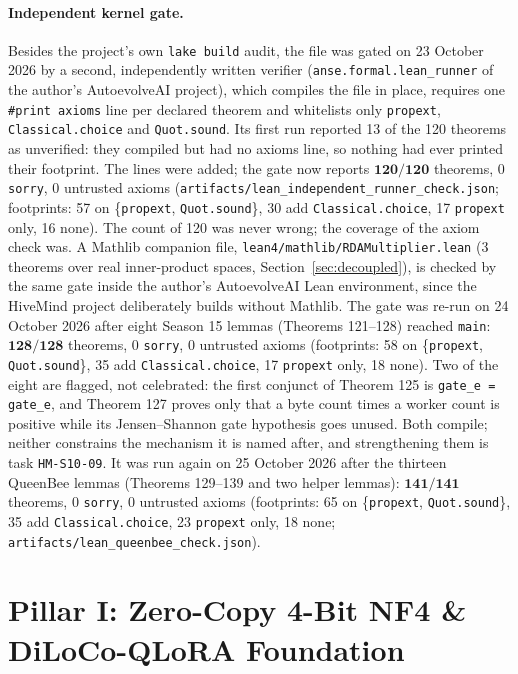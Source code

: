 \documentclass[11pt,a4paper]{article}
\begin{document}
\paragraph{Independent kernel gate.} Besides the project's own \texttt{lake build} audit, the file was gated on 23 October 2026 by a second, independently written verifier (\texttt{anse.formal.lean\_runner} of the author's AutoevolveAI project), which compiles the file in place, requires one \texttt{\#print axioms} line per declared theorem and whitelists only \texttt{propext}, \texttt{Classical.choice} and \texttt{Quot.sound}. Its first run reported 13 of the 120 theorems as unverified: they compiled but had no axioms line, so nothing had ever printed their footprint. The lines were added; the gate now reports $\mathbf{120/120}$ theorems, $0$ \texttt{sorry}, $0$ untrusted axioms (\texttt{artifacts/lean\_independent\_runner\_check.json}; footprints: 57 on \{\texttt{propext}, \texttt{Quot.sound}\}, 30 add \texttt{Classical.choice}, 17 \texttt{propext} only, 16 none). The count of 120 was never wrong; the coverage of the axiom check was. A Mathlib companion file, \texttt{lean4/mathlib/RDAMultiplier.lean} (3 theorems over real inner-product spaces, Section~\ref{sec:decoupled}), is checked by the same gate inside the author's AutoevolveAI Lean environment, since the HiveMind project deliberately builds without Mathlib. The gate was re-run on 24 October 2026 after eight Season 15 lemmas (Theorems 121--128) reached \texttt{main}: $\mathbf{128/128}$ theorems, $0$ \texttt{sorry}, $0$ untrusted axioms (footprints: 58 on \{\texttt{propext}, \texttt{Quot.sound}\}, 35 add \texttt{Classical.choice}, 17 \texttt{propext} only, 18 none). Two of the eight are flagged, not celebrated: the first conjunct of Theorem 125 is \texttt{gate\_e = gate\_e}, and Theorem 127 proves only that a byte count times a worker count is positive while its Jensen--Shannon gate hypothesis goes unused. Both compile; neither constrains the mechanism it is named after, and strengthening them is task \texttt{HM-S10-09}. It was run again on 25 October 2026 after the thirteen QueenBee lemmas (Theorems 129--139 and two helper lemmas): $\mathbf{141/141}$ theorems, $0$ \texttt{sorry}, $0$ untrusted axioms (footprints: 65 on \{\texttt{propext}, \texttt{Quot.sound}\}, 35 add \texttt{Classical.choice}, 23 \texttt{propext} only, 18 none; \texttt{artifacts/lean\_queenbee\_check.json}).

\section{Pillar I: Zero-Copy 4-Bit NF4 \& DiLoCo-QLoRA Foundation}
\end{document}
